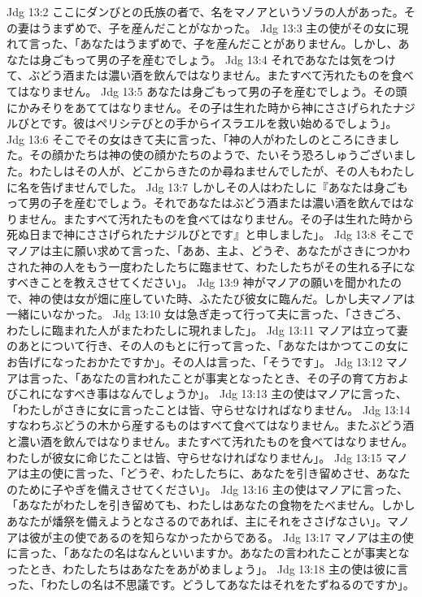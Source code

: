 Jdg 13:2  ここにダンびとの氏族の者で、名をマノアというゾラの人があった。その妻はうまずめで、子を産んだことがなかった。
Jdg 13:3  主の使がその女に現れて言った、「あなたはうまずめで、子を産んだことがありません。しかし、あなたは身ごもって男の子を産むでしょう。
Jdg 13:4  それであなたは気をつけて、ぶどう酒または濃い酒を飲んではなりません。またすべて汚れたものを食べてはなりません。
Jdg 13:5  あなたは身ごもって男の子を産むでしょう。その頭にかみそりをあててはなりません。その子は生れた時から神にささげられたナジルびとです。彼はペリシテびとの手からイスラエルを救い始めるでしょう」。
Jdg 13:6  そこでその女はきて夫に言った、「神の人がわたしのところにきました。その顔かたちは神の使の顔かたちのようで、たいそう恐ろしゅうございました。わたしはその人が、どこからきたのか尋ねませんでしたが、その人もわたしに名を告げませんでした。
Jdg 13:7  しかしその人はわたしに『あなたは身ごもって男の子を産むでしょう。それであなたはぶどう酒または濃い酒を飲んではなりません。またすべて汚れたものを食べてはなりません。その子は生れた時から死ぬ日まで神にささげられたナジルびとです』と申しました」。
Jdg 13:8  そこでマノアは主に願い求めて言った、「ああ、主よ、どうぞ、あなたがさきにつかわされた神の人をもう一度わたしたちに臨ませて、わたしたちがその生れる子になすべきことを教えさせてください」。
Jdg 13:9  神がマノアの願いを聞かれたので、神の使は女が畑に座していた時、ふたたび彼女に臨んだ。しかし夫マノアは一緒にいなかった。
Jdg 13:10  女は急ぎ走って行って夫に言った、「さきごろ、わたしに臨まれた人がまたわたしに現れました」。
Jdg 13:11  マノアは立って妻のあとについて行き、その人のもとに行って言った、「あなたはかつてこの女にお告げになったおかたですか」。その人は言った、「そうです」。
Jdg 13:12  マノアは言った、「あなたの言われたことが事実となったとき、その子の育て方およびこれになすべき事はなんでしょうか」。
Jdg 13:13  主の使はマノアに言った、「わたしがさきに女に言ったことは皆、守らせなければなりません。
Jdg 13:14  すなわちぶどうの木から産するものはすべて食べてはなりません。またぶどう酒と濃い酒を飲んではなりません。またすべて汚れたものを食べてはなりません。わたしが彼女に命じたことは皆、守らせなければなりません」。
Jdg 13:15  マノアは主の使に言った、「どうぞ、わたしたちに、あなたを引き留めさせ、あなたのために子やぎを備えさせてください」。
Jdg 13:16  主の使はマノアに言った、「あなたがわたしを引き留めても、わたしはあなたの食物をたべません。しかしあなたが燔祭を備えようとなさるのであれば、主にそれをささげなさい」。マノアは彼が主の使であるのを知らなかったからである。
Jdg 13:17  マノアは主の使に言った、「あなたの名はなんといいますか。あなたの言われたことが事実となったとき、わたしたちはあなたをあがめましょう」。
Jdg 13:18  主の使は彼に言った、「わたしの名は不思議です。どうしてあなたはそれをたずねるのですか」。
